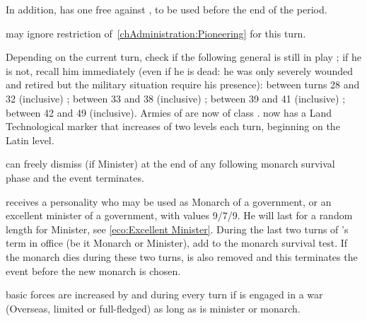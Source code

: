 \aparag In addition, \ENG has one free \OCB against \HOL, to be used before
the end of the period.

\phadm
\aparag \ENG may ignore restriction of~\ref{chAdministration:Pioneering} for
this turn.





\phevnt
\aparag Depending on the current turn, check if the following general is still
in play ; if he is not, recall him immediately (even if he is dead: he was
only severely wounded and retired but the military situation require his
presence):
\bparag \leaderPappenheim between turns 28 and 32 (inclusive) ;
\bparag \leaderMontecuccoli between 33 and 38 (inclusive) ;
\bparag {} between 39 and 41 (inclusive) ;
\bparag {} between 42 and 49 (inclusive).
\aparag Armies of \AUSaus are now of class \CAIV.
\aparag \AUSMin now has a Land Technological marker that increases of two
levels each turn, beginning on the Latin level.





\aparag \HOL can freely dismiss  (if Minister) at the
end of any following monarch survival phase and the event terminates.

\phevnt
\aparag \HOL receives a personality  who may be used as
Monarch of a  government, or an excellent minister of a
 government, with values 9/7/9.  He will last for a random
length for Minister, see \ref{eco:Excellent Minister}.
\aparag During the last two turns of 's term in office (be
it Monarch or Minister), add  to the monarch survival test.  If the
monarch dies during these two turns,  is also removed and
this terminates the event before the new monarch is chosen.

\phadm
\aparag \HOL basic forces are increased by \FLEET\facemoins and \ARMY\faceplus
during every turn if is engaged in a war (Overseas, limited or full-fledged)
as long as  is minister or monarch.



